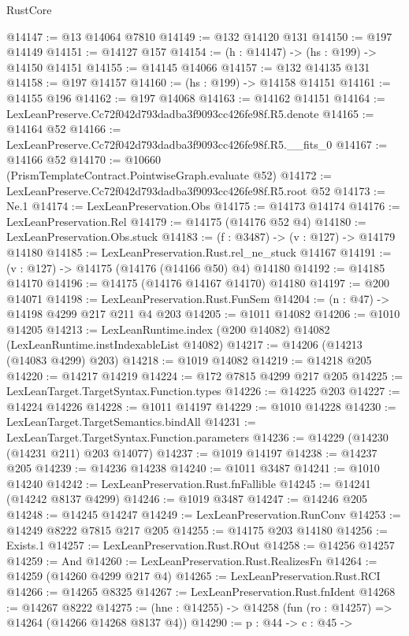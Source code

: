 \begin{lexlean}{RustCore}
\begin{coremodule}
@14147 := @13 @14064 @7810
@14149 := @132 @14120 @131
@14150 := @197 @14149
@14151 := @14127 @157
@14154 := (h : @14147) -> (hs : @199) -> @14150 @14151
@14155 := @14145 @14066
@14157 := @132 @14135 @131
@14158 := @197 @14157
@14160 := (hs : @199) -> @14158 @14151
@14161 := @14155 @196
@14162 := @197 @14068
@14163 := @14162 @14151
@14164 := LexLeanPreserve.Cc72f042d793dadba3f9093cc426fe98f.R5.denote
@14165 := @14164 @52
@14166 := LexLeanPreserve.Cc72f042d793dadba3f9093cc426fe98f.R5.__fits_0
@14167 := @14166 @52
@14170 := @10660 (PrismTemplateContract.PointwiseGraph.evaluate @52)
@14172 := LexLeanPreserve.Cc72f042d793dadba3f9093cc426fe98f.R5.root @52
@14173 := Ne.{1}
@14174 := LexLeanPreservation.Obs
@14175 := @14173 @14174
@14176 := LexLeanPreservation.Rel
@14179 := @14175 (@14176 @52 @4)
@14180 := LexLeanPreservation.Obs.stuck
@14183 := (f : @3487) -> (v : @127) -> @14179 @14180
@14185 := LexLeanPreservation.Rust.rel_ne_stuck @14167
@14191 := (v : @127) -> @14175 (@14176 (@14166 @50) @4) @14180
@14192 := @14185 @14170
@14196 := @14175 (@14176 @14167 @14170) @14180
@14197 := @200 @14071
@14198 := LexLeanPreservation.Rust.FunSem
@14204 := (n : @47) -> @14198 @4299 @217 @211 @4 @203
@14205 := @1011 @14082
@14206 := @1010 @14205
@14213 := LexLeanRuntime.index (@200 @14082) @14082 (LexLeanRuntime.instIndexableList @14082)
@14217 := @14206 (@14213 (@14083 @4299) @203)
@14218 := @1019 @14082
@14219 := @14218 @205
@14220 := @14217 @14219
@14224 := @172 @7815 @4299 @217 @205
@14225 := LexLeanTarget.TargetSyntax.Function.types
@14226 := @14225 @203
@14227 := @14224 @14226
@14228 := @1011 @14197
@14229 := @1010 @14228
@14230 := LexLeanTarget.TargetSemantics.bindAll
@14231 := LexLeanTarget.TargetSyntax.Function.parameters
@14236 := @14229 (@14230 (@14231 @211) @203 @14077)
@14237 := @1019 @14197
@14238 := @14237 @205
@14239 := @14236 @14238
@14240 := @1011 @3487
@14241 := @1010 @14240
@14242 := LexLeanPreservation.Rust.fnFallible
@14245 := @14241 (@14242 @8137 @4299)
@14246 := @1019 @3487
@14247 := @14246 @205
@14248 := @14245 @14247
@14249 := LexLeanPreservation.RunConv
@14253 := @14249 @8222 @7815 @217 @205
@14255 := @14175 @203 @14180
@14256 := Exists.{1}
@14257 := LexLeanPreservation.Rust.ROut
@14258 := @14256 @14257
@14259 := And
@14260 := LexLeanPreservation.Rust.RealizesFn
@14264 := @14259 (@14260 @4299 @217 @4)
@14265 := LexLeanPreservation.Rust.RCI
@14266 := @14265 @8325
@14267 := LexLeanPreservation.Rust.fnIdent
@14268 := @14267 @8222
@14275 := (hne : @14255) -> @14258 (fun (ro : @14257) => @14264 (@14266 @14268 @8137 @4))
@14290 := {p : @44} ->
  {c : @45} ->

\end{coremodule}
\end{lexlean}
